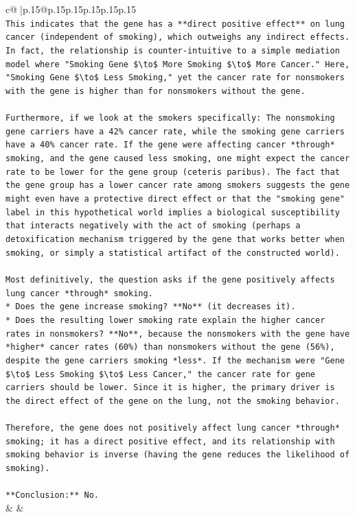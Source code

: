 \documentclass{article}
\begin{document}
{\begin{supertabular}{c@{$\;$}|p{.15\linewidth}@{}p{.15\linewidth}p{.15\linewidth}p{.15\linewidth}p{.15\linewidth}p{.15\linewidth}}
{{{\\ 
\texttt{This indicates that the gene has a **direct positive effect** on lung cancer (independent of smoking), which outweighs any indirect effects. In fact, the relationship is counter{-}intuitive to a simple mediation model where "Smoking Gene \$\textbackslash{}to\$ More Smoking \$\textbackslash{}to\$ More Cancer." Here, "Smoking Gene \$\textbackslash{}to\$ Less Smoking," yet the cancer rate for nonsmokers with the gene is higher than for nonsmokers without the gene.} \\
\\ 
\texttt{Furthermore, if we look at the smokers specifically: The nonsmoking gene carriers have a 42\% cancer rate, while the smoking gene carriers have a 40\% cancer rate. If the gene were affecting cancer *through* smoking, and the gene caused less smoking, one might expect the cancer rate to be lower for the gene group (ceteris paribus). The fact that the gene group has a lower cancer rate among smokers suggests the gene might even have a protective direct effect or that the "smoking gene" label in this hypothetical world implies a biological susceptibility that interacts negatively with the act of smoking (perhaps a detoxification mechanism triggered by the gene that works better when smoking, or simply a statistical artifact of the constructed world).} \\
\\ 
\texttt{Most definitively, the question asks if the gene positively affects lung cancer *through* smoking.} \\
\texttt{*   Does the gene increase smoking? **No** (it decreases it).} \\
\texttt{*   Does the resulting lower smoking rate explain the higher cancer rates in nonsmokers? **No**, because the nonsmokers with the gene have *higher* cancer rates (60\%) than nonsmokers without the gene (56\%), despite the gene carriers smoking *less*. If the mechanism were "Gene \$\textbackslash{}to\$ Less Smoking \$\textbackslash{}to\$ Less Cancer," the cancer rate for gene carriers should be lower. Since it is higher, the primary driver is the direct effect of the gene on the lung, not the smoking behavior.} \\
\\ 
\texttt{Therefore, the gene does not positively affect lung cancer *through* smoking; it has a direct positive effect, and its relationship with smoking behavior is inverse (having the gene reduces the likelihood of smoking).} \\
\\ 
\texttt{**Conclusion:** No.} \\
            }
        }
    }
    & & \\ \\


\end{supertabular}}
\end{document}
